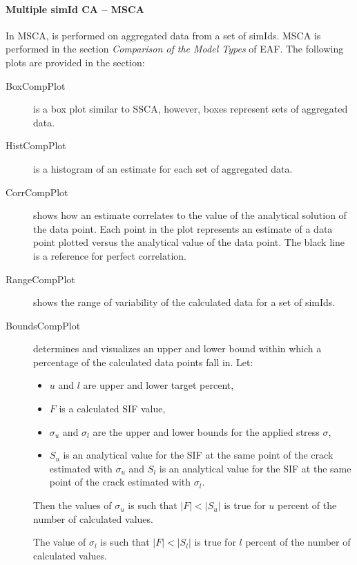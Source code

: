 \documentclass[10pt,a4paper]{article}
\begin{document}
\paragraph{Multiple simId CA  -- MSCA}\hfill \break
In MSCA, is performed on aggregated data from a set of simIds. MSCA is performed in the section \textit{Comparison of the Model Types} of EAF. The following plots are provided in the section:

\begin{description}

\item[BoxCompPlot] is a box plot similar to SSCA, however, boxes represent sets of aggregated data.

\item[HistCompPlot] is a histogram of an estimate for each set of aggregated data.

\item[CorrCompPlot] shows how an estimate correlates to the value of the analytical solution of the data point. Each point in the plot represents an estimate of a data point plotted versus the analytical value of the data point. The black line is a reference for perfect correlation.

\item[RangeCompPlot] shows the range of variability of the calculated data for a set of simIds.

\item[BoundsCompPlot] determines and visualizes an upper and lower bound within which a percentage of the calculated data points fall in. Let:

\begin{itemize}
\item $u$ and $l$ are upper and lower target percent,
\item $F$ is a calculated SIF value,
\item $\sigma_{u}$ and $\sigma_{l}$ are the upper and lower bounds for the applied stress $\sigma$,
\item $S_{u}$ is an analytical value for the SIF at the same point of the crack estimated with $\sigma_u$ and $S_{l}$ is an analytical value for the SIF at the same point of the crack estimated with $\sigma_l$.
\end{itemize}

Then the values of $\sigma_{u}$ is such that $|F| < |S_{u}|$ is true for $u$ percent of the number of calculated values.

The value of $\sigma_{l}$ is such that $|F| < |S_{l}|$ is true for $l$ percent of the number of calculated values.

\end{description}
\end{document}
